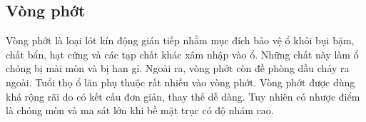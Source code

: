 \subsection{Vòng phớt}
Vòng phớt là loại lót kín động gián tiếp nhằm mục đích bảo vệ ổ khỏi bụi bặm, chất
bẩn, hạt cứng và các tạp chất khác xâm nhập vào ổ. Những chất này làm ổ chóng bị mài
mòn và bị han gỉ. Ngoài ra, vòng phớt còn đề phòng dầu chảy ra ngoài. Tuổi thọ ổ lăn phụ
thuộc rất nhiều vào vòng phớt.
Vòng phớt được dùng khá rộng rãi do có kết cấu đơn giản, thay thế dễ dàng. Tuy nhiên
có nhược điểm là chóng mòn và ma sát lớn khi bề mặt trục có độ nhám cao.

